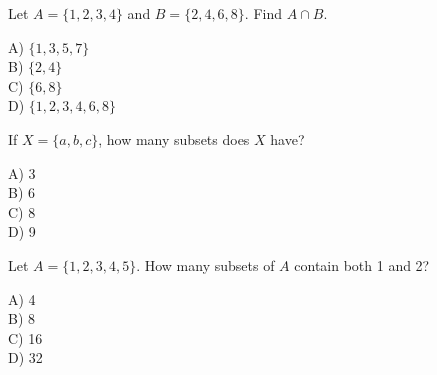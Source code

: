 \documentclass[12pt,letterpaper, onecolumn]{exam}
\begin{document}
\begin{questions}

\question[3 Marks]
Let \(A = \{1,2,3,4\}\) and \(B = \{2,4,6,8\}\).  
Find \(A \cap B\).
\begin{multicols}{2}
A) \(\{1,3,5,7\}\)\\
B) \(\{2,4\}\)\\
C) \(\{6,8\}\)\\
D) \(\{1,2,3,4,6,8\}\)
\end{multicols}
\droppoints
\answerspace[1.2cm]

\question[3 Marks]
If \(X = \{a,b,c\}\), how many subsets does \(X\) have?  
\begin{multicols}{2}
A) 3 \\ B) 6 \\ C) 8 \\ D) 9
\end{multicols}
\droppoints
\answerspace[1.2cm]

\question[4 Marks]
Let \(A = \{1,2,3,4,5\}\).  
How many subsets of \(A\) contain both 1 and 2?
\begin{multicols}{2}
A) 4 \\ B) 8 \\ C) 16 \\ D) 32
\end{multicols}
\droppoints
\answerspace[1.4cm]

\end{questions}

\end{document}
